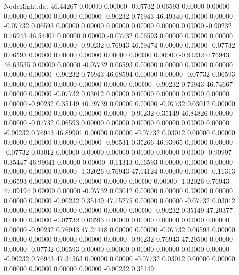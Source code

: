 \begin{filecontents}{NodeRight.dat}
  46.44267    0.00000    0.00000    -0.07732    0.06593    0.00000    0.00000    0.00000    0.00000    0.00000    0.00000   -0.90232    0.76943
  46.49340    0.00000    0.00000    -0.07732    0.06593    0.00000    0.00000    0.00000    0.00000    0.00000    0.00000   -0.90232    0.76943
  46.54407    0.00000    0.00000    -0.07732    0.06593    0.00000    0.00000    0.00000    0.00000    0.00000    0.00000   -0.90232    0.76943
  46.59474    0.00000    0.00000    -0.07732    0.06593    0.00000    0.00000    0.00000    0.00000    0.00000    0.00000   -0.90232    0.76943
  46.63535    0.00000    0.00000    -0.07732    0.06593    0.00000    0.00000    0.00000    0.00000    0.00000    0.00000   -0.90232    0.76943
  46.68594    0.00000    0.00000    -0.07732    0.06593    0.00000    0.00000    0.00000    0.00000    0.00000    0.00000   -0.90232    0.76943
  46.74667    0.00000    0.00000    -0.07732    0.03012    0.00000    0.00000    0.00000    0.00000    0.00000    0.00000   -0.90232    0.35149
  46.79739    0.00000    0.00000    -0.07732    0.03012    0.00000    0.00000    0.00000    0.00000    0.00000    0.00000   -0.90232    0.35149
  46.84826    0.00000    0.00000    -0.07732    0.06593    0.00000    0.00000    0.00000    0.00000    0.00000    0.00000   -0.90232    0.76943
  46.89901    0.00000    0.00000    -0.07732    0.03012    0.00000    0.00000    0.00000    0.00000    0.00000    0.00000   -0.90531    0.35266
  46.93965    0.00000    0.00000    -0.07732    0.03012    0.00000    0.00000    0.00000    0.00000    0.00000    0.00000   -0.90997    0.35447
  46.99041    0.00000    0.00000    -0.11313    0.06593    0.00000    0.00000    0.00000    0.00000    0.00000    0.00000   -1.32026    0.76943
  47.04124    0.00000    0.00000    -0.11313    0.06593    0.00000    0.00000    0.00000    0.00000    0.00000    0.00000   -1.32026    0.76943
  47.09194    0.00000    0.00000    -0.07732    0.03012    0.00000    0.00000    0.00000    0.00000    0.00000    0.00000   -0.90232    0.35149
  47.15275    0.00000    0.00000    -0.07732    0.03012    0.00000    0.00000    0.00000    0.00000    0.00000    0.00000   -0.90232    0.35149
  47.20377    0.00000    0.00000    -0.07732    0.06593    0.00000    0.00000    0.00000    0.00000    0.00000    0.00000   -0.90232    0.76943
  47.24448    0.00000    0.00000    -0.07732    0.06593    0.00000    0.00000    0.00000    0.00000    0.00000    0.00000   -0.90232    0.76943
  47.29500    0.00000    0.00000    -0.07732    0.06593    0.00000    0.00000    0.00000    0.00000    0.00000    0.00000   -0.90232    0.76943
  47.34563    0.00000    0.00000    -0.07732    0.03012    0.00000    0.00000    0.00000    0.00000    0.00000    0.00000   -0.90232    0.35149

\end{filecontents}
